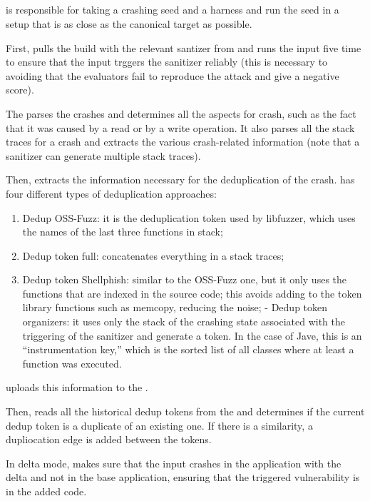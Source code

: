 \subsection{\povguy}

\povguy is responsible for taking a crashing seed and a harness and run the seed in a setup that is as close as the canonical target as possible.

First, \povguy pulls the build with the relevant santizer from \builder and runs the input five time to ensure that the input trggers the sanitizer reliably (this is necessary to avoiding that the evaluators fail to reproduce the attack and give a negative score).

The \povguy parses the crashes and determines all the aspects for crash, such as the fact that it was caused by a read or by a write operation.
It also parses all the stack traces for a crash and extracts the various crash-related information (note that a sanitizer can generate multiple stack traces).

Then, \povguy extracts the information necessary for the deduplication of the crash. 
\povguy has four different types of deduplication approaches:
\begin{enumerate}
\item Dedup OSS-Fuzz: it is the deduplication token used by libfuzzer, which uses the names of the last three functions in stack;
\item Dedup token full: concatenates everything in a stack traces;
\item Dedup token Shellphish: similar to the OSS-Fuzz one, but it only uses the functions that are indexed in the source code; this avoids adding to the token library functions such as memcopy, reducing the noise;
- Dedup token organizers: it uses only the stack of the crashing state associated with the triggering of the sanitizer and generate a token. In the case of Jave, this is an ``instrumentation key,'' which is the sorted list of all classes where at least a function was executed. 
\end{enumerate}
\povguy uploads this information to the \analysisgraph.

Then, \povguy reads all the historical dedup tokens from the \analysisgraph  and determines if the current dedup token is a duplicate of an existing one.
If there is a similarity, a dupliocation edge is added between the tokens.

In delta mode, \povguy makes sure that the input crashes in the application with the delta and not in the base application, ensuring that the triggered vulnerability is in the added code.


